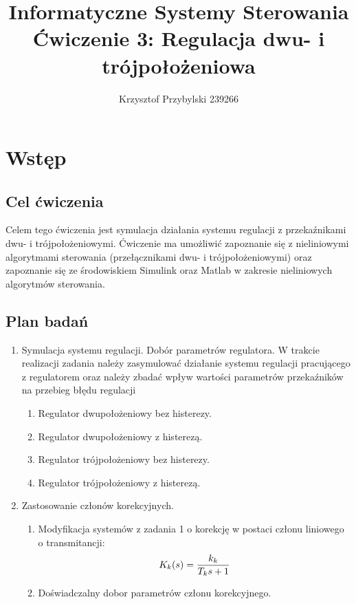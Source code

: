 \documentclass[a4paper,10pt]{article}
\title{Informatyczne Systemy Sterowania \\ \large Ćwiczenie 3: Regulacja dwu- i trójpołożeniowa}
\author{Krzysztof Przybylski 239266}
\begin{document}
\maketitle

\section{Wstęp}\label{sec:wstęp}
\subsection{Cel ćwiczenia}
Celem tego ćwiczenia jest symulacja działania systemu regulacji z przekaźnikami dwu- i trójpołożeniowymi. Ćwiczenie ma umożliwić zapoznanie się z nieliniowymi algorytmami sterowania (przełącznikami dwu- i trójpołożeniowymi) oraz zapoznanie się ze środowiskiem Simulink oraz Matlab w zakresie nieliniowych algorytmów sterowania.

\subsection{Plan badań} 
\begin{enumerate}
	\item Symulacja systemu regulacji. Dobór parametrów regulatora. \newline
	 \small {W trakcie realizacji zadania należy zasymulować działanie systemu regulacji pracującego z regulatorem oraz należy zbadać wpływ wartości parametrów przekaźników na przebieg błędu regulacji}
	\begin{enumerate}
		\item Regulator dwupołożeniowy bez histerezy.
		\item Regulator dwupołożeniowy z histerezą.
		\item Regulator trójpołożeniowy bez histerezy.
		\item Regulator trójpołożeniowy z histerezą.
 	\end{enumerate}
	\item Zastosowanie członów korekcyjnych.
	\begin{enumerate}
		\item Modyfikacja systemów z zadania 1 o korekcję w postaci członu liniowego o transmitancji: 
			\begin{equation} \label{eqn:czlonKorekcyjny}
				K_{k}(s) = {{k_{k}} \over {T_{k}s+1}}
			\end{equation}
		\item Doświadczalny dobor parametrów członu korekcyjnego.
	\end{enumerate}
\end{enumerate}
\end{document}
